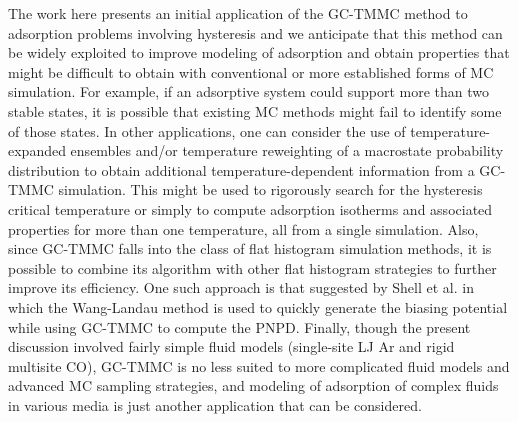 The work here presents an initial application of the GC-TMMC method to adsorption problems involving hysteresis and we anticipate that this method can be widely exploited to improve modeling of adsorption and obtain properties that might be difficult to obtain with conventional or more established forms of MC simulation.
For example, if an adsorptive system could support more than two stable states, it is possible that existing MC methods might fail to identify some of those states.
In other applications, one can consider the use of temperature-expanded ensembles\cite{Lyubartsev_New_1991,Grzelak_Nanoscale_2010,Kumar_Monte_2011} and/or temperature reweighting\cite{Errington_Direct_2003} of a macrostate probability distribution to obtain additional temperature-dependent information from a GC-TMMC simulation.
This might be used to rigorously search for the hysteresis critical temperature or simply to compute adsorption isotherms and associated properties for more than one temperature, all from a single simulation.
Also, since GC-TMMC falls into the class of flat histogram simulation methods, it is possible to combine its algorithm with other flat histogram strategies to further improve its efficiency.
One such approach is that suggested by Shell et al.\cite{Shell_improved_2003} in which the Wang-Landau method\cite{Wang_Efficient_2001,Wang_Determining_2001,Shell_Generalization_2002,Shell_improved_2003} is used to quickly generate the biasing potential while using GC-TMMC to compute the PNPD.
Finally, though the present discussion involved fairly simple fluid models (single-site LJ Ar and rigid multisite CO), GC-TMMC is no less suited to more complicated fluid models and advanced MC sampling strategies, and modeling of adsorption of complex fluids in various media is just another application that can be considered.

